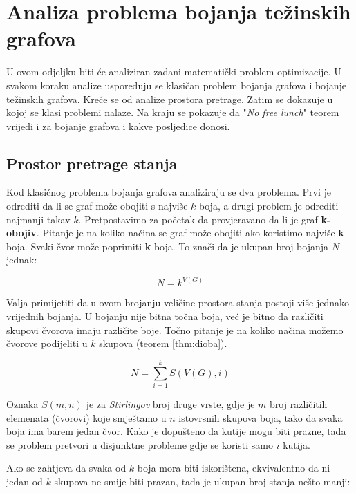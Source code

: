 \documentclass[times, utf8, diplomski, numeric]{fer}
\begin{document}
\section{Analiza problema bojanja težinskih grafova}

U ovom odjeljku biti će analiziran zadani matematički problem optimizacije. U svakom koraku analize uspoređuju se klasičan problem bojanja grafova i bojanje težinskih grafova. Kreće se od analize prostora pretrage. Zatim se dokazuje u kojoj se klasi problemi nalaze. Na kraju se pokazuje da "\emph{No free lunch}" teorem vrijedi i za bojanje grafova i kakve posljedice donosi.

\subsection{Prostor pretrage stanja}

Kod klasičnog problema bojanja grafova analiziraju se dva problema. Prvi je odrediti da li se graf može obojiti s najviše $k$ boja, a drugi problem je odrediti najmanji takav $k$. Pretpostavimo za početak da provjeravano da li je graf \textbf{k-obojiv}. Pitanje je na koliko načina se graf može obojiti ako koristimo najviše \textbf{k} boja. Svaki čvor može poprimiti \textbf{k} boja. To znači da je ukupan broj bojanja $N$ jednak: 

\begin{equation}
N = k^{V(G)} 
\end{equation}

Valja primijetiti da u ovom brojanju veličine prostora stanja postoji više jednako vrijednih bojanja. U bojanju nije bitna točna boja, već je bitno da različiti skupovi čvorova imaju različite boje. Točno pitanje je na koliko načina možemo čvorove podijeliti u $k$ skupova (teorem \ref{thm:dioba}).  

\begin{equation}
N = \sum_{i=1}^{k} S(V(G), i)
\end{equation}

Oznaka $S(m,n)$ je za \emph{Stirlingov} broj druge vrste, gdje je $m$ broj različitih elemenata (čvorovi) koje smještamo u $n$ istovrsnih skupova boja, tako da svaka boja ima barem jedan čvor. Kako je dopušteno da kutije mogu biti prazne, tada se problem pretvori u disjunktne probleme gdje se koristi samo $i$ kutija. 

Ako se zahtjeva da svaka od $k$ boja mora biti iskorištena, ekvivalentno da ni jedan od $k$ skupova ne smije biti prazan, tada je ukupan broj stanja nešto manji:
\end{document}
